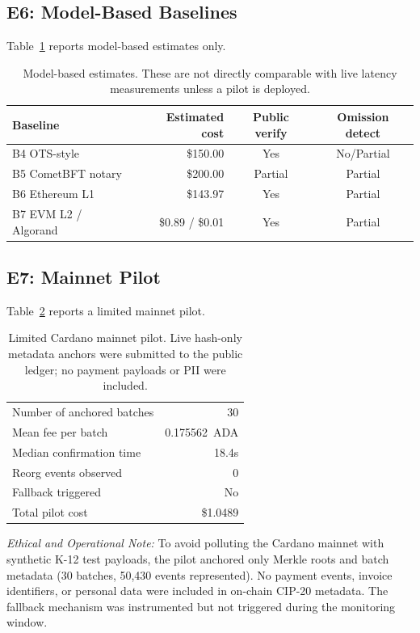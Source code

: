 \documentclass[journal]{IEEEtran}
\begin{document}
\subsection{E6: Model-Based Baselines}
Table~\ref{tab:model-baselines} reports model-based estimates only.

\begin{table}[!t]
\centering
\caption{Model-based estimates. These are not directly comparable with live latency measurements unless a pilot is deployed.}
\label{tab:model-baselines}
\small
\begin{tabular}{@{}l r c c@{}}
\toprule
Baseline & Estimated cost & Public verify & Omission detect \\
\midrule
B4 OTS-style & \$150.00 & Yes & No/Partial \\
B5 CometBFT notary & \$200.00 & Partial & Partial \\
B6 Ethereum L1 & \$143.97 & Yes & Partial \\
B7 EVM L2 / Algorand & \$0.89 / \$0.01 & Yes & Partial \\
\bottomrule
\end{tabular}
\end{table}

\subsection{E7: Mainnet Pilot}
Table~\ref{tab:mainnet} reports a limited mainnet pilot.

\begin{table}[!t]
\centering
\caption{Limited Cardano mainnet pilot. Live hash-only metadata anchors were submitted to the public ledger; no payment payloads or PII were included.}
\label{tab:mainnet}
\small
\begin{tabular}{@{}l r@{}}
\toprule
Number of anchored batches & 30 \\
Mean fee per batch & 0.175562~ADA \\
Median confirmation time & 18.4s \\
Reorg events observed & 0 \\
Fallback triggered & No \\
Total pilot cost & \$1.0489 \\
\bottomrule
\end{tabular}
\end{table}



\textit{Ethical and Operational Note:} To avoid polluting the Cardano mainnet with synthetic K-12 test payloads, the pilot anchored only Merkle roots and batch metadata (30 batches, 50{,}430 events represented). No payment events, invoice identifiers, or personal data were included in on-chain CIP-20 metadata. The fallback mechanism was instrumented but not triggered during the monitoring window.
\end{document}
